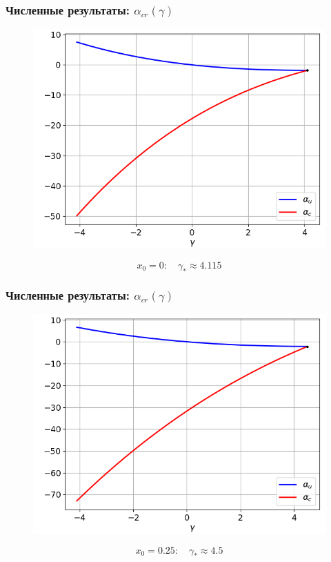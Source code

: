 \documentclass[fullscreen=true, unicode, bookmarks=false]{beamer}
\begin{document}
\begin{frame}
\frametitle{ Численные результаты: $ \alpha_{cr}(\gamma) $ }

\begin{figure} 
\includegraphics[scale=0.55]{alphas_0.png}  
\end{figure}

$$ x_0 = 0: \quad \gamma_* \approx 4.115 $$

\end{frame}

\begin{frame}
\frametitle{ Численные результаты: $ \alpha_{cr}(\gamma) $ }

\begin{figure} 
\includegraphics[scale=0.55]{alphas_14.png}  
\end{figure}

$$ x_0 = 0.25: \quad \gamma_* \approx 4.5 $$

\end{frame}
\end{document}
